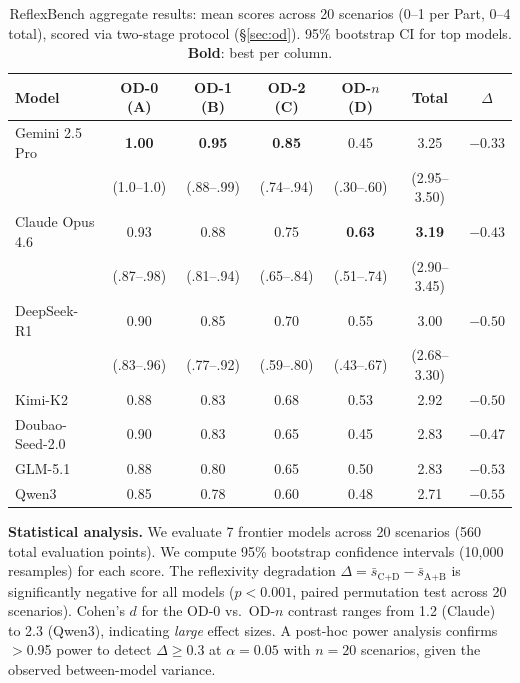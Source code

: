 \documentclass{article}
\begin{document}
\begin{table}[h]
\centering
\caption{ReflexBench aggregate results: mean scores across 20 scenarios (0--1 per Part, 0--4 total), scored via two-stage protocol (\S\ref{sec:od}). 95\% bootstrap CI for top models. \textbf{Bold}: best per column.}
\label{tab:results}
\begin{tabular}{@{}lcccccc@{}}
\toprule
\textbf{Model} & \textbf{OD-0 (A)} & \textbf{OD-1 (B)} & \textbf{OD-2 (C)} & \textbf{OD-$n$ (D)} & \textbf{Total} & \textbf{$\Delta$} \\
\midrule
Gemini 2.5 Pro & \textbf{1.00} & \textbf{0.95} & \textbf{0.85} & 0.45 & 3.25 & $-0.33$ \\
 & {\tiny(1.0--1.0)} & {\tiny(.88--.99)} & {\tiny(.74--.94)} & {\tiny(.30--.60)} & {\tiny(2.95--3.50)} & \\
Claude Opus 4.6 & 0.93 & 0.88 & 0.75 & \textbf{0.63} & \textbf{3.19} & $-0.43$ \\
 & {\tiny(.87--.98)} & {\tiny(.81--.94)} & {\tiny(.65--.84)} & {\tiny(.51--.74)} & {\tiny(2.90--3.45)} & \\
DeepSeek-R1 & 0.90 & 0.85 & 0.70 & 0.55 & 3.00 & $-0.50$ \\
 & {\tiny(.83--.96)} & {\tiny(.77--.92)} & {\tiny(.59--.80)} & {\tiny(.43--.67)} & {\tiny(2.68--3.30)} & \\
Kimi-K2 & 0.88 & 0.83 & 0.68 & 0.53 & 2.92 & $-0.50$ \\
Doubao-Seed-2.0 & 0.90 & 0.83 & 0.65 & 0.45 & 2.83 & $-0.47$ \\
GLM-5.1 & 0.88 & 0.80 & 0.65 & 0.50 & 2.83 & $-0.53$ \\
Qwen3 & 0.85 & 0.78 & 0.60 & 0.48 & 2.71 & $-0.55$ \\
\bottomrule
\end{tabular}
\end{table}

\textbf{Statistical analysis.} We evaluate 7 frontier models across 20 scenarios (560 total evaluation points). We compute 95\% bootstrap confidence intervals (10{,}000 resamples) for each score. The reflexivity degradation $\Delta = \bar{s}_{\text{C+D}} - \bar{s}_{\text{A+B}}$ is significantly negative for all models ($p < 0.001$, paired permutation test across 20 scenarios). Cohen's $d$ for the OD-0 vs.\ OD-$n$ contrast ranges from 1.2 (Claude) to 2.3 (Qwen3), indicating \textit{large} effect sizes. A post-hoc power analysis confirms $>$0.95 power to detect $\Delta \geq 0.3$ at $\alpha = 0.05$ with $n = 20$ scenarios, given the observed between-model variance.
\end{document}
